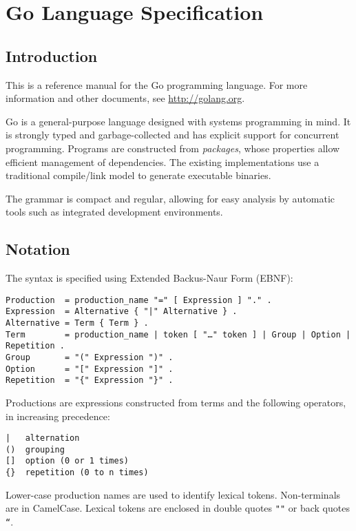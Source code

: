 \cleardoublepage
{}
{}
\chapter*{Go Language Specification}

\section*{Introduction}

This is a reference manual for the Go programming language. For more
information and other documents, see
\href{http://golang.org/}{http://golang.org}.

Go is a general-purpose language designed with systems programming in
mind. It is strongly typed and garbage-collected and has explicit
support for concurrent programming. Programs are constructed from
\emph{packages}, whose properties allow efficient management of
dependencies. The existing implementations use a traditional
compile/link model to generate executable binaries.

The grammar is compact and regular, allowing for easy analysis by
automatic tools such as integrated development environments.

\section*{Notation}

The syntax is specified using Extended Backus-Naur Form (EBNF):

\begin{Verbatim}[frame=single]
Production  = production_name "=" [ Expression ] "." .
Expression  = Alternative { "|" Alternative } .
Alternative = Term { Term } .
Term        = production_name | token [ "…" token ] | Group | Option | Repetition .
Group       = "(" Expression ")" .
Option      = "[" Expression "]" .
Repetition  = "{" Expression "}" .
\end{Verbatim}

Productions are expressions constructed from terms and the following
operators, in increasing precedence:

\begin{Verbatim}[frame=single]
|   alternation
()  grouping
[]  option (0 or 1 times)
{}  repetition (0 to n times)
\end{Verbatim}

Lower-case production names are used to identify lexical tokens.
Non-terminals are in CamelCase. Lexical tokens are enclosed in double
quotes \texttt{""} or back quotes \texttt{``}.

